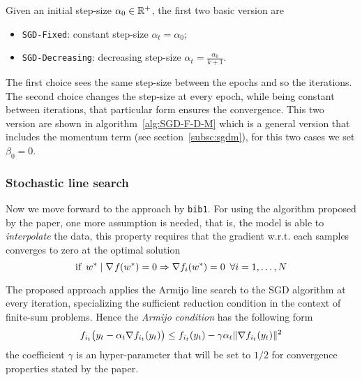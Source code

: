 Given an initial step-size $\alpha_0\in\mathbb{R}^+$, the first two basic version are 
\begin{itemize}
\item \texttt{SGD-Fixed}: constant step-size $\alpha_t=\alpha_0$;
\item \texttt{SGD-Decreasing}: decreasing step-size $\alpha_t=\frac{\alpha_0}{k+1}$.
\end{itemize}
The first choice sees the same step-size between the epochs and so the iterations. The second choice changes the step-size at every epoch, while being constant between iterations, that particular form ensures the convergence. This two version are shown in algorithm~\vref{alg:SGD-F-D-M} which is a general version that includes the momentum term (see section~\ref{subsc:sgdm}), for this two cases we set $\beta_0=0$.

\subsubsection{Stochastic line search}

Now we move forward to the approach by \texttt{bib1}. For using the algorithm proposed by the paper, one more assumption is needed, that is, the model is able to \emph{interpolate} the data, this property requires that the gradient w.r.t. each samples converges to zero at the optimal solution
\[
\text{if}\,\,\,w^\ast\mid\nabla\operatorname*{\mathit{f}}(w^\ast)=0\Rightarrow\nabla f_i(w^\ast)=0\,\,\,\forall i=1,\dots,N
\]

The proposed approach applies the Armijo line search to the SGD algorithm at every iteration, specializing the sufficient reduction condition in the context of finite-sum problems. Hence the \emph{Armijo condition} has the following form
\begin{equation}\label{eq:mini-armijo}
f_{i_t}\bigl(y_t-\alpha_t\nabla f_{i_t}(y_t)\bigr)\leq f_{i_t}(y_t)-\gamma\alpha_t\lVert\nabla f_{i_t}(y_t)\rVert^2
\end{equation}
the coefficient $\gamma$ is an hyper-parameter that will be set to $1/2$ for convergence properties stated by the paper.


